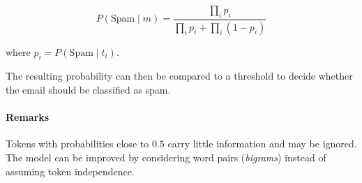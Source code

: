 \[
P(\text{Spam}\mid m)
=
\frac{\prod_i p_i}
     {\prod_i p_i + \prod_i (1-p_i)}
\]

where $p_i=P(\text{Spam}\mid t_i)$.

The resulting probability can then be compared to a threshold to decide whether the email should be classified as spam.

\paragraph{Remarks}
Tokens with probabilities close to $0.5$ carry little information and may be ignored. The model can be improved by considering word pairs (\emph{bigrams}) instead of assuming token independence. 